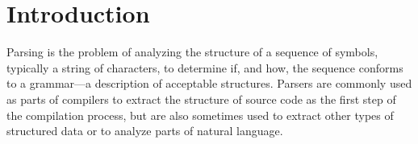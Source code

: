 \chapter{Introduction}


%

	Parsing is the problem of analyzing the structure of a sequence of
	symbols, typically a string of characters, to determine if, and how, the
	sequence conforms to a grammar---a description of acceptable structures.
	Parsers are commonly used as parts of compilers to extract the structure of
	source code as the first step of the compilation process, but are also
	sometimes used to extract other types of structured data or to analyze
	parts of natural language.

